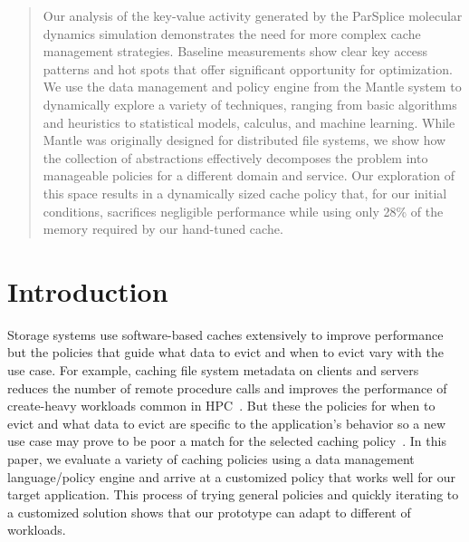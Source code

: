 \begin{abstract}

Our analysis of the key-value activity generated by the ParSplice molecular
dynamics simulation demonstrates the need for more complex cache management
strategies. Baseline measurements show clear key access patterns and hot
spots that offer significant opportunity for optimization. We use the data
management and policy engine from the Mantle system to dynamically explore a
variety of techniques, ranging from basic algorithms and heuristics to
statistical models, calculus, and machine learning. While Mantle was originally
designed for distributed file systems, we show how the collection of
abstractions effectively decomposes the problem into manageable policies for a
different domain and service.  Our exploration of this space results in a
dynamically sized cache policy that, for our initial conditions, sacrifices
negligible performance while using only 28\% of the memory required by our
hand-tuned cache.

\end{abstract}

\section{Introduction}

Storage systems use software-based caches extensively to improve performance
but the policies that guide what data to evict and when to evict vary with the
use case. For example, caching file system metadata on clients and servers
reduces the number of remote procedure calls and improves the performance of
create-heavy workloads common in HPC~\cite{ren:sc2014-indexfs,
patil:fast2011-giga+}. But these the policies for when to evict and what data
to evict are specific to the application's behavior so a new use case may prove
to be poor a match for the selected caching
policy~\cite{xiao:socc15-shardfs,brandt:msst2003-lh,sevilla:sc15-mantle,
weil:sc2004-dyn-metadata, weil:osdi2006-ceph}. In this paper, we evaluate a
variety of caching policies using a data management language/policy engine and
arrive at a customized policy that works well for our target application.  This
process of trying general policies and quickly iterating to a customized
solution shows that our prototype can adapt to different of workloads.


